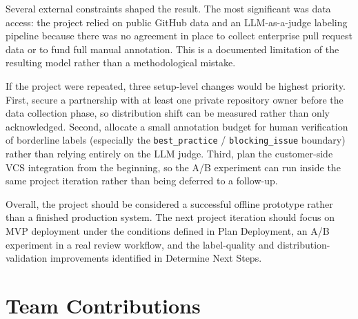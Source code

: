 \documentclass[11pt]{article}
\begin{document}
Several external constraints shaped the result. The most significant was data access: the project relied on public GitHub data and an LLM-as-a-judge labeling pipeline because there was no agreement in place to collect enterprise pull request data or to fund full manual annotation. This is a documented limitation of the resulting model rather than a methodological mistake.

If the project were repeated, three setup-level changes would be highest priority. First, secure a partnership with at least one private repository owner before the data collection phase, so distribution shift can be measured rather than only acknowledged. Second, allocate a small annotation budget for human verification of borderline labels (especially the \texttt{best\_practice} / \texttt{blocking\_issue} boundary) rather than relying entirely on the LLM judge. Third, plan the customer-side VCS integration from the beginning, so the A/B experiment can run inside the same project iteration rather than being deferred to a follow-up.

Overall, the project should be considered a successful offline prototype rather than a finished production system. The next project iteration should focus on MVP deployment under the conditions defined in Plan Deployment, an A/B experiment in a real review workflow, and the label-quality and distribution-validation improvements identified in Determine Next Steps.


\section*{Team Contributions}
\end{document}
